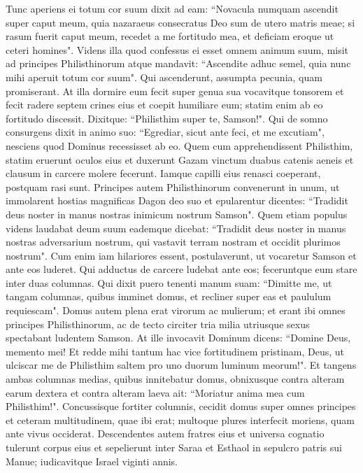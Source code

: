\begin{biblechapter}
\verse Tunc aperiens ei totum cor suum dixit ad eam: “Novacula numquam ascendit super caput meum, quia nazaraeus consecratus Deo sum de utero matris meae; si rasum fuerit caput meum, recedet a me fortitudo mea, et deficiam eroque ut ceteri homines". 
\verse Videns illa quod confessus ei esset omnem animum suum, misit ad principes Philisthinorum atque mandavit: “Ascendite adhuc semel, quia nunc mihi aperuit totum cor suum". Qui ascenderunt, assumpta pecunia, quam promiserant. 
\verse At illa dormire eum fecit super genua sua vocavitque tonsorem et fecit radere septem crines eius et coepit humiliare eum; statim enim ab eo fortitudo discessit. 
\verse Dixitque: “Philisthim super te, Samson!". Qui de somno consurgens dixit in animo suo: “Egrediar, sicut ante feci, et me excutiam", nesciens quod Dominus recessisset ab eo. 
\verse Quem cum apprehendissent Philisthim, statim eruerunt oculos eius et duxerunt Gazam vinctum duabus catenis aeneis et clausum in carcere molere fecerunt. 
\verse Iamque capilli eius renasci coeperant, postquam rasi sunt. 
\verse Principes autem Philisthinorum convenerunt in unum, ut immolarent hostias magnificas Dagon deo suo et epularentur dicentes: “Tradidit deus noster in manus nostras inimicum nostrum Samson". 
\verse Quem etiam populus videns laudabat deum suum eademque dicebat: “Tradidit deus noster in manus nostras adversarium nostrum, qui vastavit terram nostram et occidit plurimos nostrum". 
\verse Cum enim iam hilariores essent, postulaverunt, ut vocaretur Samson et ante eos luderet. Qui adductus de carcere ludebat ante eos; feceruntque eum stare inter duas columnas. 
\verse Qui dixit puero tenenti manum suam: “Dimitte me, ut tangam columnas, quibus imminet domus, et recliner super eas et paululum requiescam". 
\verse Domus autem plena erat virorum ac mulierum; et erant ibi omnes principes Philisthinorum, ac de tecto circiter tria milia utriusque sexus spectabant ludentem Samson. 
\verse At ille invocavit Dominum dicens: “Domine Deus, memento mei! Et redde mihi tantum hac vice fortitudinem pristinam, Deus, ut ulciscar me de Philisthim saltem pro uno duorum luminum meorum!". 
\verse Et tangens ambas columnas medias, quibus innitebatur domus, obnixusque contra alteram earum dextera et contra alteram laeva 
\verse ait: “Moriatur anima mea cum Philisthim!". Concussisque fortiter columnis, cecidit domus super omnes principes et ceteram multitudinem, quae ibi erat; multoque plures interfecit moriens, quam ante vivus occiderat. 
\verse Descendentes autem fratres eius et universa cognatio tulerunt corpus eius et sepelierunt inter Saraa et Esthaol in sepulcro patris sui Manue; iudicavitque Israel viginti annis. 
\end{biblechapter}

